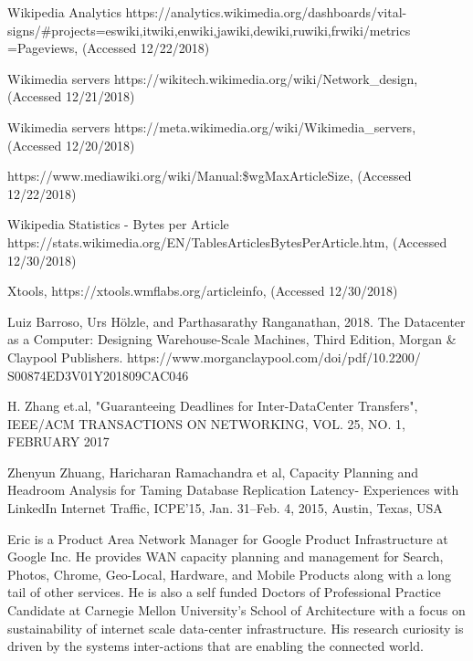 \documentclass[conference]{IEEEtran}
\begin{document}
\begin{thebibliography}{00}
 Wikipedia Analytics 
https://analytics.wikimedia.org/dashboards/vital-signs/\#projects=eswiki,itwiki,enwiki,jawiki,dewiki,ruwiki,frwiki/metrics =Pageviews, (Accessed 12/22/2018)

 Wikimedia servers https://wikitech.wikimedia.org/wiki/Network\_design, (Accessed 12/21/2018)

 Wikimedia servers https://meta.wikimedia.org/wiki/Wikimedia\_servers, (Accessed 12/20/2018) 

 https://www.mediawiki.org/wiki/Manual:\$wgMaxArticleSize, (Accessed 12/22/2018)

 Wikipedia Statistics - Bytes per Article https://stats.wikimedia.org/EN/TablesArticlesBytesPerArticle.htm, (Accessed 12/30/2018)

 Xtools, https://xtools.wmflabs.org/articleinfo, (Accessed 12/30/2018)

Luiz Barroso, Urs H\"olzle, and Parthasarathy Ranganathan, 2018. The Datacenter as a Computer: Designing Warehouse-Scale Machines, Third Edition, Morgan \& Claypool Publishers. https://www.morganclaypool.com/doi/pdf/10.2200/  S00874ED3V01Y201809CAC046

H. Zhang et.al, "Guaranteeing Deadlines for Inter-DataCenter Transfers", IEEE/ACM TRANSACTIONS ON NETWORKING, VOL. 25, NO. 1, FEBRUARY 2017

 Zhenyun Zhuang, Haricharan Ramachandra et al, Capacity Planning and Headroom Analysis for Taming Database Replication Latency- Experiences with LinkedIn Internet Traffic, ICPE’15, Jan. 31–Feb. 4, 2015, Austin, Texas, USA

\end{thebibliography}
\vspace{12pt}
\color{blue}
Eric is a Product Area Network Manager for Google Product Infrastructure at Google Inc. He provides WAN capacity planning and management for Search, Photos, Chrome, Geo-Local, Hardware, and Mobile Products along with a long tail of other services. He is also a self funded Doctors of Professional Practice Candidate at Carnegie Mellon University's School of Architecture with a focus on sustainability of internet scale data-center infrastructure. His research curiosity is driven by the systems inter-actions that are enabling the connected world.
\end{document}
